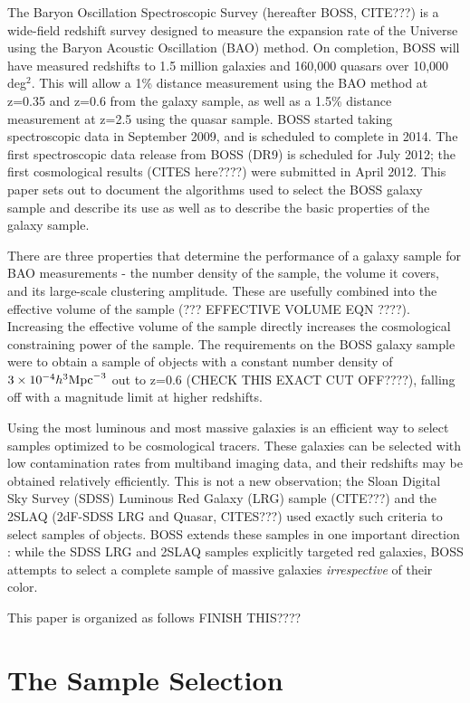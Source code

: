 \documentclass[preprint]{aastex}
\begin{document}
The Baryon Oscillation Spectroscopic Survey (hereafter BOSS, CITE???) is a
wide-field redshift survey designed to measure the expansion rate of the
Universe using the Baryon Acoustic Oscillation (BAO) method. On completion, BOSS
will have measured redshifts to 1.5 million galaxies and 160,000 quasars over
10,000 deg$^2$. This will allow a 1\% distance measurement using the BAO method
at z=0.35 and z=0.6 from the galaxy sample, as well as a 1.5\% distance
measurement at z=2.5 using the quasar sample. BOSS started taking spectroscopic 
data in September 2009, and is scheduled to complete in 2014. The first
spectroscopic data release from BOSS (DR9) is scheduled for July 2012; the first
cosmological results (CITES here????) were submitted in April 2012.
This paper sets out to document the algorithms used to select the BOSS galaxy
sample and describe its use as well as to describe the basic properties of the
galaxy sample.

There are three properties that determine the performance of a galaxy sample for
BAO measurements - the number density of the sample, the volume it covers, and
its large-scale clustering amplitude. These are usefully combined into the
effective volume of the sample (??? EFFECTIVE VOLUME EQN ????). Increasing the
effective volume of the sample directly increases the cosmological constraining
power of the sample. The requirements on the BOSS galaxy sample were to obtain
a sample of objects with a constant number density of $3 \times 10^{-4} h^{3}
\rm{Mpc}^{-3}$ out to z=0.6 (CHECK THIS EXACT CUT OFF????), falling off with a
magnitude limit at higher redshifts. 

Using the most luminous and most massive galaxies is an
efficient way to select samples optimized to be cosmological tracers. These
galaxies can be selected with low contamination rates from multiband imaging
data, and their redshifts may be obtained relatively efficiently. This is 
not a new observation; the Sloan Digital Sky Survey (SDSS) Luminous Red Galaxy
(LRG) sample (CITE???) and the 2SLAQ (2dF-SDSS LRG and Quasar, CITES???) used 
exactly such criteria to select samples of objects. BOSS extends these samples
in one important direction : while the SDSS LRG and 2SLAQ samples explicitly
targeted red galaxies, BOSS attempts to select a complete sample of massive
galaxies {\it irrespective} of their color. 

This paper is organized as follows FINISH THIS????

\section{The Sample Selection}
\end{document}

